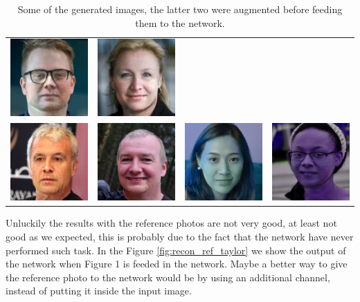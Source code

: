 \documentclass[10pt,twocolumn,letterpaper]{article}
\begin{document}
\begin{table}
\begin{tabular}{cccc}
    \includegraphics[width=.2\linewidth]{samples/00353.jpg}&
    \includegraphics[width=.2\linewidth]{samples/00708.jpg}\\
    \includegraphics[width=.2\linewidth]{samples/recon_600.png}&
    \includegraphics[width=.2\linewidth]{samples/recon_900.png}&
    \includegraphics[width=.2\linewidth]{samples/aug_recon_1600.png}&
    \includegraphics[width=.2\linewidth]{samples/aug_recon_200.png}\\
\end{tabular}
  \label{tab:photos}
  \caption{Some of the generated images, the latter two were augmented before
  feeding them to the network.}
\end{table}

Unluckily the results with the reference photos are not very good, at least not
good as we expected, this is probably due to the fact that the network have never
performed such task. In the Figure \ref{fig:recon_ref_taylor} we show the output
of the network when Figure 1 is feeded in the network. Maybe a better way to
give the reference photo to the network would be by using an additional channel,
instead of putting it inside the input image.
\end{document}
